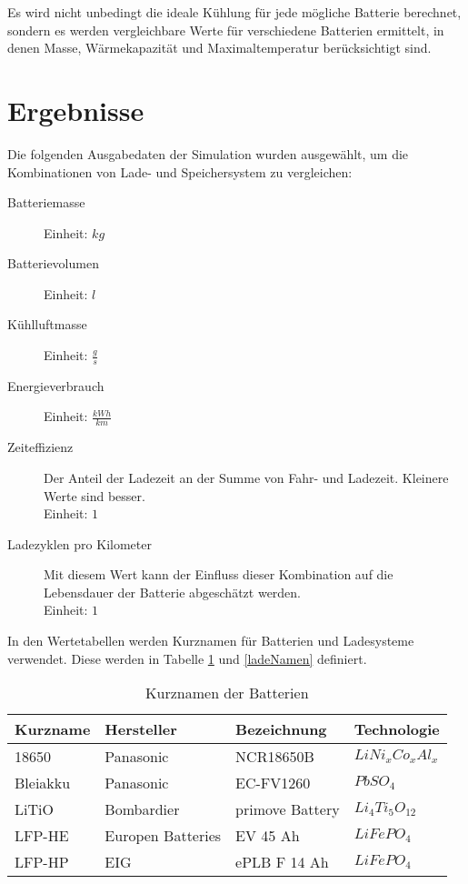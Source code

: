 Es wird nicht unbedingt die ideale Kühlung für jede mögliche Batterie berechnet, sondern es werden vergleichbare Werte für verschiedene Batterien ermittelt, in denen Masse, Wärmekapazität und Maximaltemperatur berücksichtigt sind.

\section{Ergebnisse}
\label{simErgebnisse}
Die folgenden Ausgabedaten der Simulation wurden ausgewählt, um die Kombinationen von Lade- und Speichersystem zu vergleichen:
\begin{description}
	\item[Batteriemasse] Einheit: $kg$
	\item[Batterievolumen] Einheit: $l$
	\item[Kühlluftmasse] Einheit: $\frac{g}{s}$
	\item[Energieverbrauch] Einheit: $\frac{kWh}{km}$
	\item[Zeiteffizienz] Der Anteil der Ladezeit an der Summe von Fahr- und Ladezeit. Kleinere Werte sind besser.\\
	Einheit: $1$
	\item[Ladezyklen pro Kilometer] Mit diesem Wert kann der Einfluss dieser Kombination auf die Lebensdauer der Batterie abgeschätzt werden.\\
	Einheit: $1$
\end{description}

In den Wertetabellen werden Kurznamen für Batterien und Ladesysteme verwendet. Diese werden in Tabelle \ref{batNamen} und \ref{ladeNamen} definiert.

\begin{table}\centering
	\begin{tabularx}{\textwidth}{XXXl}
		\toprule
		Kurzname & Hersteller        & Bezeichnung     & Technologie      \\ \midrule
		18650    & Panasonic         & NCR18650B       & $LiNi_xCo_xAl_x$ \\
		Bleiakku & Panasonic         & EC-FV1260       & $PbSO_4$         \\
		LiTiO    & Bombardier        & primove Battery & $Li_4Ti_5O_{12}$ \\
		LFP-HE   & Europen Batteries & EV 45 Ah        & $LiFePO_4$       \\
		LFP-HP   & EIG               & ePLB F 14 Ah    & $LiFePO_4$       \\ \bottomrule
	\end{tabularx}
	\caption{Kurznamen der Batterien}
	\label{batNamen}
\end{table}

